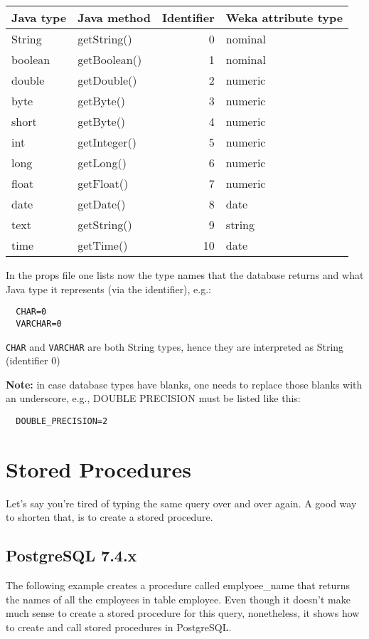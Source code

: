 \vspace{0.5cm}
\begin{tabular}{l|l|r|l}
Java type 	& Java method 	& Identifier 	& Weka attribute type \\
\hline
String		& getString() 	& 0	 	& nominal \\
boolean 	& getBoolean() 	& 1 		& nominal \\
double 		& getDouble() 	& 2 		& numeric \\
byte 		& getByte() 	& 3 		& numeric \\
short 		& getByte() 	& 4 		& numeric \\
int 		& getInteger() 	& 5 		& numeric \\
long 		& getLong() 	& 6 		& numeric \\
float 		& getFloat() 	& 7 		& numeric \\
date 		& getDate() 	& 8 		& date \\
text 		& getString() 	& 9 		& string \\
time 		& getTime() 	& 10 		& date \\
\end{tabular}
\vspace{0.5cm}

\noindent In the props file one lists now the type names that the database returns and what Java type it represents (via the identifier), e.g.:

\begin{verbatim}
  CHAR=0
  VARCHAR=0
\end{verbatim}

\noindent \texttt{CHAR} and \texttt{VARCHAR} are both String types, hence they are interpreted as String (identifier 0)

\noindent \textbf{Note:} in case database types have blanks, one needs to replace those blanks with an underscore, e.g., DOUBLE PRECISION must be listed like this:

\begin{verbatim}
  DOUBLE_PRECISION=2
\end{verbatim}


\section{Stored Procedures}
Let's say you're tired of typing the same query over and over again. A good way to shorten that, is to create a stored procedure.

\subsection*{PostgreSQL 7.4.x}
The following example creates a procedure called emplyoee\_name that returns the names of all the employees in table employee. Even though it doesn't make much sense to create a stored procedure for this query, nonetheless, it shows how to create and call stored procedures in PostgreSQL.

